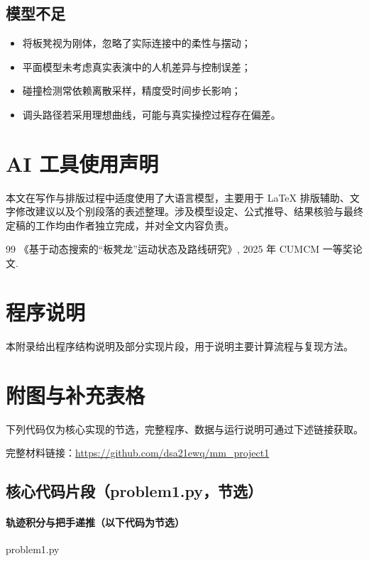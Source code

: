 \documentclass[12pt,a4paper]{ctexart}
\begin{document}
\subsection{模型不足}
\begin{itemize}[leftmargin=2em]
    \item 将板凳视为刚体，忽略了实际连接中的柔性与摆动；
    \item 平面模型未考虑真实表演中的人机差异与控制误差；
    \item 碰撞检测常依赖离散采样，精度受时间步长影响；
    \item 调头路径若采用理想曲线，可能与真实操控过程存在偏差。
\end{itemize}

\section{AI 工具使用声明}
本文在写作与排版过程中适度使用了大语言模型，主要用于 LaTeX 排版辅助、文字修改建议以及个别段落的表述整理。涉及模型设定、公式推导、结果核验与最终定稿的工作均由作者独立完成，并对全文内容负责。

\begin{thebibliography}{99}
《基于动态搜索的“板凳龙”运动状态及路线研究》, 2025 年 CUMCM 一等奖论文.
\end{thebibliography}

\appendix

\section{程序说明}
本附录给出程序结构说明及部分实现片段，用于说明主要计算流程与复现方法。

\section{附图与补充表格}
下列代码仅为核心实现的节选，完整程序、数据与运行说明可通过下述链接获取。

\noindent 完整材料链接：\url{https://github.com/dsa21ewq/mm_project1}

\subsection{核心代码片段（problem1.py，节选）}
\paragraph{轨迹积分与把手递推（以下代码为节选）}
 {problem1.py}
\end{document}
